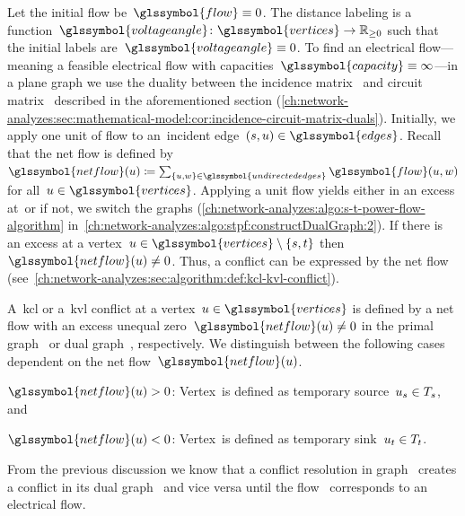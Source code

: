 Let the initial flow be~$\glssymbol{flow}\equiv 0$. The distance labeling is a
function~$\glssymbol{voltageangle}\colon\glssymbol{vertices}\to\posreals$ such
that the initial labels are~$\glssymbol{voltageangle} \equiv 0$. To find an
electrical flow---meaning a feasible electrical flow with
capacities~$\glssymbol{capacity}\equiv\infty$---in a plane graph we use the
duality between the incidence matrix~ and circuit
matrix~ described in the aforementioned section
(\cref{ch:network-analyzes:sec:mathematical-model:cor:incidence-circuit-matrix-duals}).
Initially, we apply one unit of flow to an~\source incident edge~$
(\source,\vertexa)\in\glssymbol{edges}$.
% 
Recall that the net flow is defined by~$
    \glssymbol{netflow}(\vertexa) 
    \coloneqq
    \sum_{\{\vertexa,\vertexc\}\in\glssymbol{undirectededges}}
    \glssymbol{flow}(\vertexa,\vertexc)
$ for all~$\vertexa\in\glssymbol{vertices}$. 
% 
Applying a unit flow yields either in an excess at~\vertexa or if not, we
switch the graphs (\cref{ch:network-analyzes:algo:s-t-power-flow-algorithm}
in~\cref{ch:network-analyzes:algo:stpf:constructDualGraph:2}).
% 
If there is an excess at a
vertex~$\vertexa\in\glssymbol{vertices}\setminus
\{\source,\sink\}$ then~$\glssymbol{netflow}(\vertexa) \neq 0$. Thus, a conflict
can be expressed by the net flow
(see~\cref{ch:network-analyzes:sec:algorithm:def:kcl-kvl-conflict}).
% 
\begin{definition}
    A~\gls{kcl} or a~\gls{kvl} conflict at a
    vertex~$\vertexa\in\glssymbol{vertices}$ is defined by a net flow with an
    excess unequal zero~$\glssymbol{netflow}(\vertexa) \neq 0$ in the primal
    graph~ or dual graph~, respectively.
    We distinguish between the following cases dependent on the net flow~$
    \glssymbol{netflow}(\vertexa)$.
    \begin{compactenum}[\hspace*{1cm}(CC--1) ]
        \item $\glssymbol{netflow}(\vertexa) > 0$: Vertex~\vertexa is defined as
        temporary source~$u_{s}\in T_{s}$, and
        \label{ch:network-analyzes:CC:1}
        \item $\glssymbol{netflow}(\vertexa) < 0$: Vertex~\vertexa is defined as
        temporary sink~$u_{t}\in T_{t}$.
        \label{ch:network-analyzes:CC:2}
    \end{compactenum}
    \label{ch:network-analyzes:sec:algorithm:def:kcl-kvl-conflict}
\end{definition}
% 
% 
From the previous discussion we know that a conflict resolution in
graph~ creates a conflict in its dual
graph~ and vice versa until the flow~
corresponds to an electrical flow.

